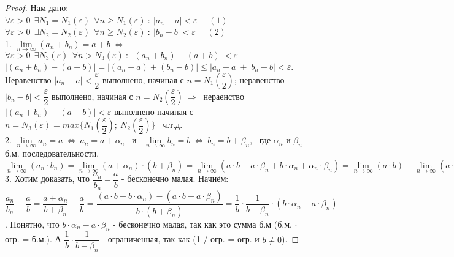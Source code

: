 \documentclass[12pt]{article}
\begin{document}
\begin{proof}
    Нам дано: \\
    $\forall \varepsilon  > 0 \ \ \exists N_1 = N_1(\varepsilon) \ \ \forall n \geq N_1(\varepsilon) \ : \  |a_n - a| < \varepsilon$ \ \ $(1)$ \\
    $\forall \varepsilon  > 0 \ \ \exists N_2 = N_2(\varepsilon) \ \ \forall n \geq N_2(\varepsilon) \ : \  |b_n - b| < \varepsilon$ \ \ $(2)$ \\
        1. $\lim\limits_{n \to \infty} (a_n + b_n) = a + b \ \Leftrightarrow \ $  $\forall \varepsilon > 0 \ \ \exists N_3(\varepsilon) \ \ \forall n > N_3(\varepsilon) \ : \  |(a_n+b_n) - (a + b)| < \varepsilon$ \\
        $|(a_n+b_n) - (a + b)| = |(a_n - a) + (b_n - b)| \leq |a_n - a| + |b_n - b| < \varepsilon$. \\
        Неравенство $|a_n-a| < \dfrac{\varepsilon}{2}$ выполнено, начиная с $n = N_1\left(\dfrac{\varepsilon}{2}\right)$; неравенство  $|b_n-b| < \dfrac{\varepsilon}{2}$ выполнено, начиная с $n = N_2\left(\dfrac{\varepsilon}{2}\right) \ \Rightarrow \ $ нераенство $ |(a_n+b_n) - (a + b)| < \varepsilon$ выполнено начиная с $n = N_3(\varepsilon) = max\{N_1\left(\dfrac{\varepsilon}{2}\right); \ N_2\left(\dfrac{\varepsilon}{2}\right)\}$  \ ч.т.д. \\
        2.  $\lim\limits_{n \to \infty} a_n = a \ \Leftrightarrow \ a_n = a + \alpha_n$ \ и \ $\lim\limits_{n \to \infty} b_n = b \ \Leftrightarrow \ b_n = b + \beta_n$, \ где $\alpha_n$ и $\beta_n$ - б.м. последовательности. \\
        $\lim\limits_{n \to \infty} (a_n \cdot b_n) = \lim\limits_{n \to \infty} (a + \alpha_n) \cdot (b + \beta_n) = \lim\limits_{n \to \infty} (a \cdot b + a \cdot \beta_n + b \cdot \alpha_n + \alpha_n \cdot \beta_n) = \lim\limits_{n \to \infty} (a \cdot b) + \lim\limits_{n \to \infty} (a \cdot \beta_n) + \lim\limits_{n \to \infty} (b \cdot \alpha_n) + \lim\limits_{n \to \infty} (\alpha_n \cdot \beta_n) = a \cdot b + 0 + 0 + 0 = a \cdot b$  \\
        3. Хотим доказать, что $\dfrac{a_n}{b_n} - \dfrac{a}{b}$ - бесконечно малая. Начнём: \\
        $\dfrac{a_n}{b_n} - \dfrac{a}{b} = \dfrac{a + \alpha_n}{b + \beta_n} - \dfrac{a}{b} = \dfrac{(a\cdot b + b \cdot \alpha_n) - (a \cdot b + a \cdot \beta_n)}{b \cdot (b + \beta_n)} = \dfrac{1}{b} \cdot \dfrac{1}{b - \beta_n} \cdot (b\cdot \alpha_n - a\cdot \beta_n)$. Понятно, что $b\cdot \alpha_n - a\cdot \beta_n$ - бесконечно малая, так как это сумма б.м (б.м. $\cdot$ огр. = б.м.). А $\dfrac1b \cdot \dfrac{1}{b - \beta_n}$ - ограниченная, так как (1 / огр. = огр. и $b \neq 0$). 
\end{proof}
\end{document}
